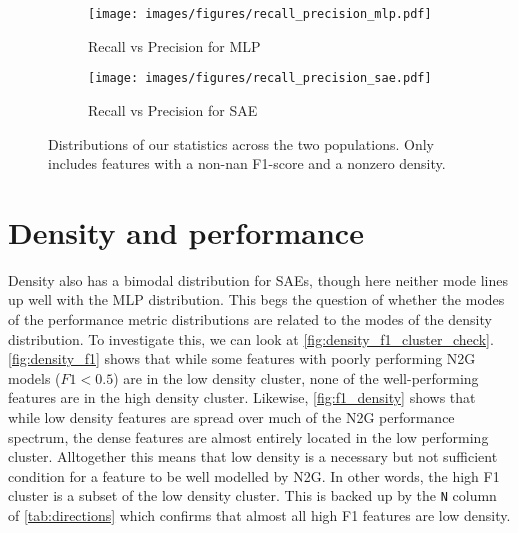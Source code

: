 \begin{figure}[ht]
    \centering
    
    \begin{subfigure}[b]{0.45\textwidth}
        \centering
        \texttt{[image: images/figures/recall\_precision\_mlp.pdf]}
        \caption{Recall vs Precision for MLP}
        \label{fig:recall_precision_mlp}
    \end{subfigure}
    \begin{subfigure}[b]{0.45\textwidth}
        \centering
        \texttt{[image: images/figures/recall\_precision\_sae.pdf]}
        \caption{Recall vs Precision for SAE}
        \label{fig:recall_precision_sae}
    \end{subfigure}
    
    \caption{Distributions of our statistics across the two populations. Only includes features with a non-nan F1-score and a nonzero density.}
    \label{fig:recall_precision}
\end{figure}

\section{Density and performance}
Density also has a bimodal distribution for SAEs, though here neither mode lines up well with the MLP distribution.
This begs the question of whether the modes of the performance metric distributions are related to the modes of the density distribution.
To investigate this, we can look at \autoref{fig:density_f1_cluster_check}.
\autoref{fig:density_f1} shows that while some features with poorly performing N2G models ($F1<0.5$) are in the low density cluster, none of the well-performing features are in the high density cluster.
Likewise, \autoref{fig:f1_density} shows that while low density features are spread over much of the N2G performance spectrum, the dense features are almost entirely located in the low performing cluster.
Alltogether this means that low density is a necessary but not sufficient condition for a feature to be well modelled by N2G.
In other words, the high F1 cluster is a subset of the low density cluster.
This is backed up by the \texttt{N} column of \autoref{tab:directions} which confirms that almost all high F1 features are low density.

